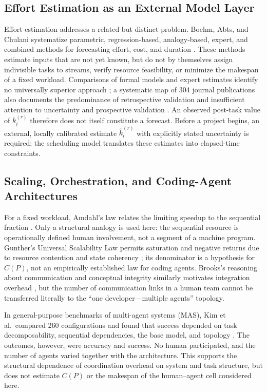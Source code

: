 \subsection{Effort Estimation as an External Model Layer}

Effort estimation addresses a related but distinct problem. Boehm, Abts, and
Chulani systematize parametric, regression-based, analogy-based, expert, and
combined methods for forecasting effort, cost, and duration
\cite{boehm2000survey}. These methods estimate inputs that are not yet known,
but do not by themselves assign indivisible tasks to streams, verify resource
feasibility, or minimize the makespan of a fixed workload. Comparisons of formal
models and expert estimates identify no universally superior approach
\cite{jorgensen2007forecasting}; a systematic map of 304 journal publications
also documents the predominance of retrospective validation and insufficient
attention to uncertainty and prospective validation
\cite{jorgensenShepperd2007systematic}. An observed post-task value of
$k_i^{(r)}$ therefore does not itself constitute a forecast. Before a project
begins, an external, locally calibrated estimate $\hat{k}_i^{(r)}$ with
explicitly stated uncertainty is required; the scheduling model translates
these estimates into elapsed-time constraints.

\subsection{Scaling, Orchestration, and Coding-Agent Architectures}

For a fixed workload, Amdahl's law relates the limiting speedup to the sequential
fraction \cite{amdahl1967validity}. Only a structural analogy is used here: the
sequential resource is operationally defined human involvement, not a segment
of a machine program. Gunther's Universal Scalability Law permits saturation
and negative returns due to resource contention and state coherency
\cite{gunther2008general}; its denominator is a hypothesis for $C(P)$, not an
empirically established law for coding agents. Brooks's reasoning about
communication and conceptual integrity similarly motivates integration overhead
\cite{brooks1995mythical}, but the number of communication links in a human team
cannot be transferred literally to the ``one developer---multiple agents''
topology.

In general-purpose benchmarks of multi-agent systems (MAS), Kim et al.\ compared
260 configurations and found that success depended on task decomposability,
sequential dependencies, the base model, and topology \cite{kim2025scaling}.
The outcomes, however, were accuracy and success. No human participated, and
the number of agents varied together with the architecture. This supports the
structural dependence of coordination overhead on system and task structure,
but does not estimate $C(P)$ or the makespan of the human--agent cell considered
here.

